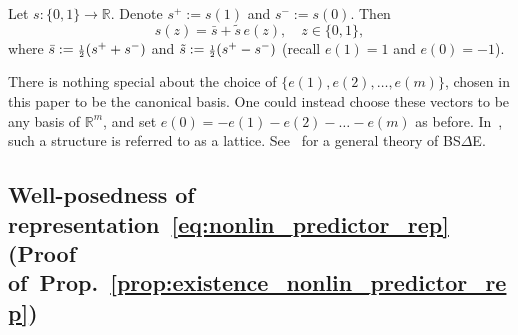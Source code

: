 \documentclass[twoside,11pt]{article}
\def\Re{\mathbb{R}}
\def\FRAC#1#2#3{\genfrac{}{}{}{#1}{#2}{#3}}
\def\half{{\mathchoice{\FRAC{1}{1}{2}}%
{\FRAC{2}{1}{2}}%
{\FRAC{3}{1}{2}}%
{\FRAC{4}{1}{2}}}}
\newcommand{\field}[1]{\mathbb{#1}}
\def\Re{\field{R}}
\def\Re{\mathbb{R}}
\def\Prop#1{Prop.~\ref{#1}}
\renewcommand{\Re}{\mathbb{R}}
\def\FRAC#1#2#3{\genfrac{}{}{}{#1}{#2}{#3}}
\begin{document}
\begin{example}[m=1] 
  Let $s:\{0,1\} \to \Re$.  
  Denote $s^+ := s(1)$ and $s^{-} := s(0)$. 
  Then
  \begin{equation*}
    s(z) = \bar{s} +  \tilde{s} \, e(z),\quad z\in\{0,1\},
  \end{equation*}
  where $\bar{s}:=\half (s^+ + s^-)$ and $\tilde{s}:= \half (s^+ - s^-)$ (recall $e(1)=1$ and $e(0)=-1$).
\end{example}

\begin{remark}
  There is nothing special about the choice of $\{e(1),e(2),\hdots,e(m)\}$, chosen in this paper to be the canonical basis.
  One could instead choose these vectors to be any basis of $\Re^m$, and set $e(0)=-e(1)-e(2)-\hdots-e(m)$ as before.
  In~\cite{fukasawa2025backward}, such a structure is referred to as a lattice. 
  See~\citep{cohen2010general} for a general theory of BS$\Delta$E.
\end{remark}


\subsection{Well-posedness of
  representation~\eqref{eq:nonlin_predictor_rep} (Proof
  of~\Prop{prop:existence_nonlin_predictor_rep})}
\label{proof:prop:existence_nonlin_predictor_rep}
\end{document}
